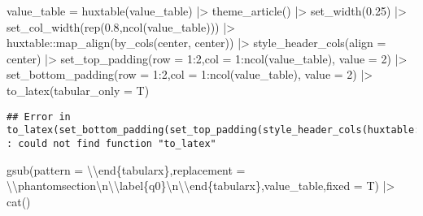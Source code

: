 \documentclass[
]{article}
\newenvironment{Shaded}{\begin{snugshade}}{\end{snugshade}}
\newcommand{\AttributeTok}[1]{\textcolor[rgb]{0.77,0.63,0.00}{#1}}
\newcommand{\DecValTok}[1]{\textcolor[rgb]{0.00,0.00,0.81}{#1}}
\newcommand{\FloatTok}[1]{\textcolor[rgb]{0.00,0.00,0.81}{#1}}
\newcommand{\FunctionTok}[1]{\textcolor[rgb]{0.00,0.00,0.00}{#1}}
\newcommand{\NormalTok}[1]{#1}
\newcommand{\OtherTok}[1]{\textcolor[rgb]{0.56,0.35,0.01}{#1}}
\newcommand{\SpecialCharTok}[1]{\textcolor[rgb]{0.00,0.00,0.00}{#1}}
\newcommand{\StringTok}[1]{\textcolor[rgb]{0.31,0.60,0.02}{#1}}
\begin{document}
\begin{minipage}[t]{0.7\linewidth}
\begin{Shaded}
\begin{Highlighting}[]
\NormalTok{               value\_table }\OtherTok{=} \FunctionTok{huxtable}\NormalTok{(value\_table) }\SpecialCharTok{|\textgreater{}}
               \FunctionTok{theme\_article}\NormalTok{() }\SpecialCharTok{|\textgreater{}}
               \FunctionTok{set\_width}\NormalTok{(}\FloatTok{0.25}\NormalTok{) }\SpecialCharTok{|\textgreater{}}
               \FunctionTok{set\_col\_width}\NormalTok{(}\FunctionTok{rep}\NormalTok{(}\FloatTok{0.8}\NormalTok{,}\FunctionTok{ncol}\NormalTok{(value\_table))) }\SpecialCharTok{|\textgreater{}}
\NormalTok{               huxtable}\SpecialCharTok{::}\FunctionTok{map\_align}\NormalTok{(}\FunctionTok{by\_cols}\NormalTok{(}\StringTok{\textquotesingle{}center\textquotesingle{}}\NormalTok{, }\StringTok{\textquotesingle{}center\textquotesingle{}}\NormalTok{)) }\SpecialCharTok{|\textgreater{}}
               \FunctionTok{style\_header\_cols}\NormalTok{(}\AttributeTok{align =} \StringTok{\textquotesingle{}center\textquotesingle{}}\NormalTok{)  }\SpecialCharTok{|\textgreater{}}
               \FunctionTok{set\_top\_padding}\NormalTok{(}\AttributeTok{row =} \DecValTok{1}\SpecialCharTok{:}\DecValTok{2}\NormalTok{,}\AttributeTok{col =} \DecValTok{1}\SpecialCharTok{:}\FunctionTok{ncol}\NormalTok{(value\_table), }\AttributeTok{value =} \DecValTok{2}\NormalTok{) }\SpecialCharTok{|\textgreater{}}
               \FunctionTok{set\_bottom\_padding}\NormalTok{(}\AttributeTok{row =} \DecValTok{1}\SpecialCharTok{:}\DecValTok{2}\NormalTok{,}\AttributeTok{col =} \DecValTok{1}\SpecialCharTok{:}\FunctionTok{ncol}\NormalTok{(value\_table), }\AttributeTok{value =} \DecValTok{2}\NormalTok{) }\SpecialCharTok{|\textgreater{}}
               \FunctionTok{to\_latex}\NormalTok{(}\AttributeTok{tabular\_only =}\NormalTok{ T) }
\end{Highlighting}
\end{Shaded}

\begin{verbatim}
## Error in to_latex(set_bottom_padding(set_top_padding(style_header_cols(huxtable::map_align(set_col_width(set_width(theme_article(huxtable(value_table)), : could not find function "to_latex"
\end{verbatim}

\begin{Shaded}
\begin{Highlighting}[]
               \FunctionTok{gsub}\NormalTok{(}\AttributeTok{pattern =} \StringTok{\textquotesingle{}}\SpecialCharTok{\textbackslash{}\textbackslash{}}\StringTok{end\{tabularx\}\textquotesingle{}}\NormalTok{,}\AttributeTok{replacement =} \StringTok{\textquotesingle{}}\SpecialCharTok{\textbackslash{}\textbackslash{}}\StringTok{phantomsection}\SpecialCharTok{\textbackslash{}n\textbackslash{}\textbackslash{}}\StringTok{label\{q0\}}\SpecialCharTok{\textbackslash{}n\textbackslash{}\textbackslash{}}\StringTok{end\{tabularx\}\textquotesingle{}}\NormalTok{,value\_table,}\AttributeTok{fixed =}\NormalTok{ T) }\SpecialCharTok{|\textgreater{}} \FunctionTok{cat}\NormalTok{()}
\end{Highlighting}
\end{Shaded}


\end{minipage}
\end{document}
